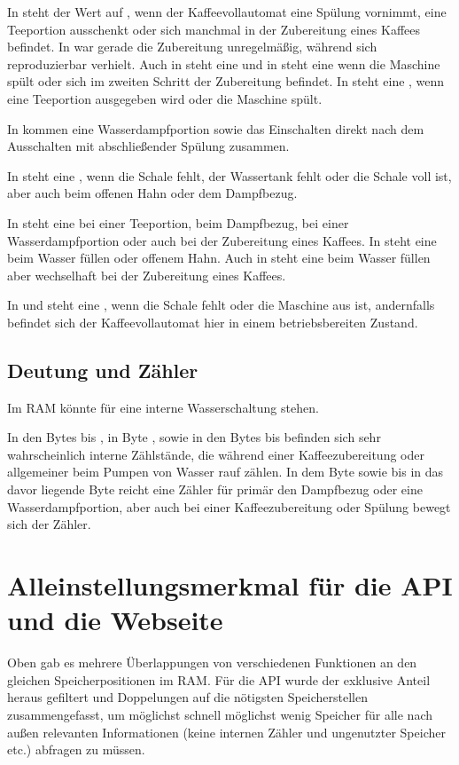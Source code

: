 In  steht der Wert auf , wenn der Kaffeevollautomat eine Spülung vornimmt, eine Teeportion ausschenkt oder sich manchmal in der Zubereitung eines Kaffees befindet.
In  war gerade die Zubereitung unregelmäßig, während sich  reproduzierbar verhielt.
Auch in  steht eine  und in  steht eine  wenn die Maschine spült oder sich im zweiten Schritt der Zubereitung befindet.
In  steht eine , wenn eine Teeportion ausgegeben wird oder die Maschine spült.

In  kommen eine Wasserdampfportion sowie das Einschalten direkt nach dem Ausschalten mit abschließender Spülung zusammen.

In  steht eine , wenn die Schale fehlt, der Wassertank fehlt oder die Schale voll ist, aber auch beim offenen Hahn oder dem Dampfbezug.

In  steht eine  bei einer Teeportion, beim Dampfbezug, bei einer Wasserdampfportion oder auch bei der Zubereitung eines Kaffees.
In  steht eine  beim Wasser füllen oder offenem Hahn.
Auch in  steht eine  beim Wasser füllen aber wechselhaft bei der Zubereitung eines Kaffees.

In  und  steht eine , wenn die Schale fehlt oder die Maschine aus ist, andernfalls befindet sich der Kaffeevollautomat hier in einem betriebsbereiten Zustand.

\subsection{Deutung und Zähler}
Im \ac{RAM} könnte  für eine interne Wasserschaltung stehen.

In den Bytes  bis , in Byte , sowie in den Bytes  bis  befinden sich sehr wahrscheinlich interne Zählstände, die während einer Kaffeezubereitung oder allgemeiner beim Pumpen von Wasser rauf zählen.
In dem Byte  sowie bis in das davor liegende Byte  reicht eine Zähler für primär den Dampfbezug oder eine Wasserdampfportion, aber auch bei einer Kaffeezubereitung oder Spülung bewegt sich der Zähler.

\section{Alleinstellungsmerkmal für die API und die Webseite}
\todo
Oben gab es mehrere Überlappungen von verschiedenen Funktionen an den gleichen Speicherpositionen im \ac{RAM}.
Für die \ac{API} wurde der exklusive Anteil heraus gefiltert und Doppelungen auf die nötigsten Speicherstellen zusammengefasst, um möglichst schnell möglichst wenig Speicher für alle nach außen relevanten Informationen (keine internen Zähler und ungenutzter Speicher etc.) abfragen zu müssen.

